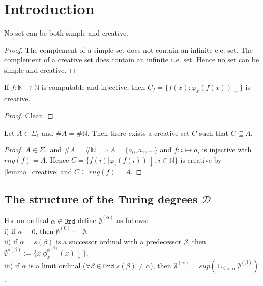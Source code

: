 \chapter{Introduction}

\begin{proposition}
No set can be both simple and creative.
\end{proposition}

\begin{proof}
The complement of a simple set does not contain an infinite c.e. set. The complement of a creative set does contain an infinite c.e. set. Hence no set can be simple and creative.
\end{proof}

\begin{lemma}\label{lemma_creative}
If $f : \mathbb{N} \to \mathbb{N}$ is computable and injective, then $C_f = \{f(x) : \varphi_x(f(x))\downarrow \}$ is creative.
\end{lemma}
\begin{proof}
Clear.
\end{proof}

\begin{proposition}
Let $A \in \Sigma_1$ and $\#A = \#\mathbb{N}$. Then there exists a creative set $C$ such that $C \subseteq A$.
\end{proposition}

\begin{proof}
$A \in \Sigma_1$ and $\#A = \#\mathbb{N} \implies A=\{a_0, a_1, ... \}$ and $f:i \mapsto a_i$ is injective with $rng(f)=A$. 
Hence $C=\{f(i) | \varphi_i(f(i))\downarrow, i \in \mathbb{N}\}$ is creative by \autoref{lemma_creative} and $C \subseteq	 rng(f) = A$.
\end{proof}

\section{The structure of the Turing degrees $\mathcal{D}$}

\begin{defn}For an ordinal $\alpha \in \mathtt{Ord}$ define $\emptyset^{(\alpha)}$ as follows:\\
i) if $\alpha=0$, then $\emptyset^{(0)}:=\emptyset$,\\
ii) if $\alpha=s(\beta)$ is a successor ordinal with a predecessor $\beta$, then $\emptyset^{s(\beta)}:=\{x | \phi^{\emptyset^{(\beta)}}_x(x) \downarrow \}$,\\
iii) if $\alpha$ is a limit ordinal ($\forall \beta \in \mathtt{Ord}. s(\beta) \not = \alpha$), then $\emptyset^{(\alpha)}=sup(\cup_{\beta < \alpha} \emptyset^{(\beta)})$.
\end{defn}

